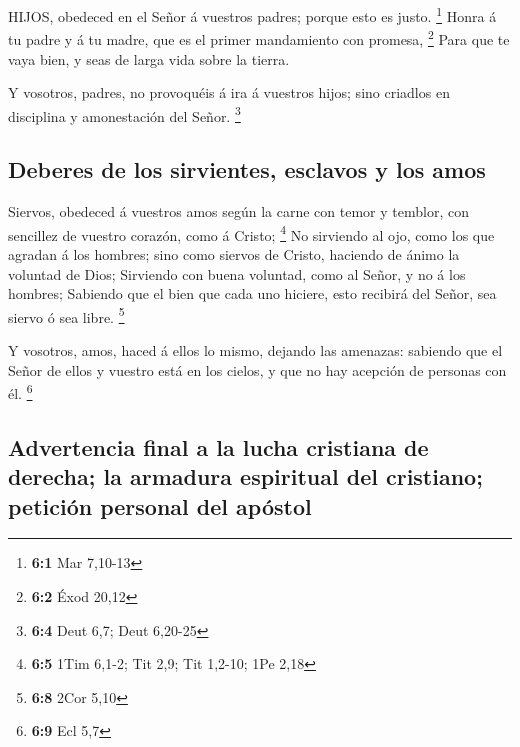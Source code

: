  HIJOS, obedeced en el Señor á vuestros padres; porque esto
es justo. \footnote{\textbf{6:1} Mar 7,10-13}  Honra á tu
padre y á tu madre, que es el primer mandamiento con promesa,
\footnote{\textbf{6:2} Éxod 20,12}  Para que te vaya bien, y
seas de larga vida sobre la tierra.

 Y vosotros, padres, no provoquéis á ira á vuestros hijos;
sino criadlos en disciplina y amonestación del Señor. \footnote{\textbf{6:4}
  Deut 6,7; Deut 6,20-25}

\hypertarget{deberes-de-los-sirvientes-esclavos-y-los-amos}{%
\subsection{Deberes de los sirvientes, esclavos y los
amos}\label{deberes-de-los-sirvientes-esclavos-y-los-amos}}

 Siervos, obedeced á vuestros amos según la carne con temor
y temblor, con sencillez de vuestro corazón, como á Cristo; \footnote{\textbf{6:5}
  1Tim 6,1-2; Tit 2,9; Tit 1,2-10; 1Pe 2,18}  No sirviendo
al ojo, como los que agradan á los hombres; sino como siervos de Cristo,
haciendo de ánimo la voluntad de Dios;  Sirviendo con buena
voluntad, como al Señor, y no á los hombres;  Sabiendo que
el bien que cada uno hiciere, esto recibirá del Señor, sea siervo ó sea
libre. \footnote{\textbf{6:8} 2Cor 5,10}

 Y vosotros, amos, haced á ellos lo mismo, dejando las
amenazas: sabiendo que el Señor de ellos y vuestro está en los cielos, y
que no hay acepción de personas con él. \footnote{\textbf{6:9} Ecl 5,7}

\hypertarget{advertencia-final-a-la-lucha-cristiana-de-derecha-la-armadura-espiritual-del-cristiano-peticiuxf3n-personal-del-apuxf3stol}{%
\subsection{Advertencia final a la lucha cristiana de derecha; la
armadura espiritual del cristiano; petición personal del
apóstol}\label{advertencia-final-a-la-lucha-cristiana-de-derecha-la-armadura-espiritual-del-cristiano-peticiuxf3n-personal-del-apuxf3stol}}

